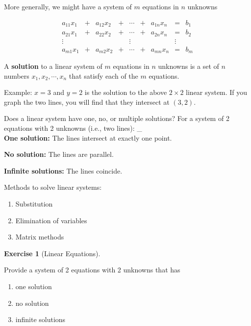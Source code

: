 \documentclass[
]{book}
\providecommand{\tightlist}{%
  \setlength{\itemsep}{0pt}\setlength{\parskip}{0pt}}
\theoremstyle{definition}
\theoremstyle{definition}
\theoremstyle{definition}
\newtheorem{exercise}{Exercise}[chapter]
\theoremstyle{remark}
\begin{document}
More generally, we might have a system of \(m\) equations in \(n\) unknowns

\[\begin{matrix}
            a_{11}x_1  & + & a_{12}x_2 & + & \cdots & + & a_{1n}x_n & = & b_1\\
            a_{21}x_1  & + & a_{22}x_2 & + & \cdots & + & a_{2n}x_n & = & b_2\\
            \vdots     &   &     &   & \vdots &   &     & \vdots & \\
            a_{m1}x_1  & + & a_{m2}x_2 & + & \cdots & + & a_{mn}x_n & = & b_m
            \end{matrix}\]

A \textbf{solution} to a linear system of \(m\) equations in \(n\) unknowns is a set of \(n\) numbers \(x_1, x_2, \cdots, x_n\) that satisfy each of the \(m\) equations.

Example: \(x=3\) and \(y=2\) is the solution to the above \(2\times 2\) linear system. If you graph the two lines, you will find that they intersect at \((3,2)\).

Does a linear system have one, no, or multiple solutions? For a system of 2 equations with 2 unknowns (i.e., two lines):
\_\\
\textbf{One solution:} The lines intersect at exactly one point.

\textbf{No solution:} The lines are parallel.

\textbf{Infinite solutions:} The lines coincide.

Methods to solve linear systems:

\begin{enumerate}
\def\labelenumi{\arabic{enumi}.}
\tightlist
\item
  Substitution
\item
  Elimination of variables
\item
  Matrix methods
\end{enumerate}

\begin{exercise}[Linear Equations]
\protect\hypertarget{exr:lineareq}{}{\label{exr:lineareq} {} }

Provide a system of 2 equations with 2 unknowns that has

\begin{enumerate}
\def\labelenumi{\arabic{enumi}.}
\item
  one solution
\item
  no solution
\item
  infinite solutions
\end{enumerate}
\end{exercise}
\end{document}
